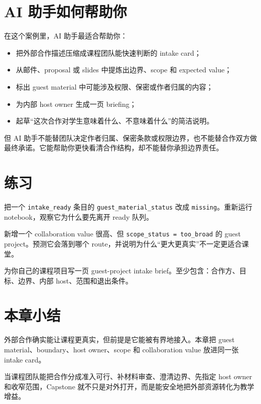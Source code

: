 \section{AI 助手如何帮助你}

在这个案例里，AI 助手最适合帮助你：

\begin{itemize}
    \item 把外部合作描述压缩成课程团队能快速判断的 intake card；
    \item 从邮件、proposal 或 slides 中提炼出边界、scope 和 expected value；
    \item 标出 guest material 中可能涉及权限、保密或作者归属的内容；
    \item 为内部 host owner 生成一页 briefing；
    \item 起草“这次合作对学生意味着什么、不意味着什么”的简洁说明。
\end{itemize}

但 AI 助手不能替团队决定作者归属、保密条款或权限边界，也不能替合作双方做最终承诺。它能帮助你更快看清合作结构，却不能替你承担边界责任。

\section{练习}

\begin{exercisebox}[基础练习]
把一个 \texttt{intake\_ready} 条目的 \texttt{guest\_material\_status} 改成 \texttt{missing}。重新运行 notebook，观察它为什么要先离开 ready 队列。
\end{exercisebox}

\begin{exercisebox}[进阶练习]
新增一个 collaboration value 很高、但 \texttt{scope\_status = too\_broad} 的 guest project。预测它会落到哪个 route，并说明为什么“更大更真实”不一定更适合课堂。
\end{exercisebox}

\begin{exercisebox}[开放练习]
为你自己的课程项目写一页 guest-project intake brief。至少包含：合作方、目标、边界、内部 host、范围和退出条件。
\end{exercisebox}

\section{本章小结}

外部合作确实能让课程更真实，但前提是它能被有界地接入。本章把 guest material、boundary、host owner、scope 和 collaboration value 放进同一张 intake card。

当课程团队能把合作分成准入可行、补材料审查、澄清边界、先指定 host owner 和收窄范围，Capstone 就不只是对外打开，而是能安全地把外部资源转化为教学增益。
